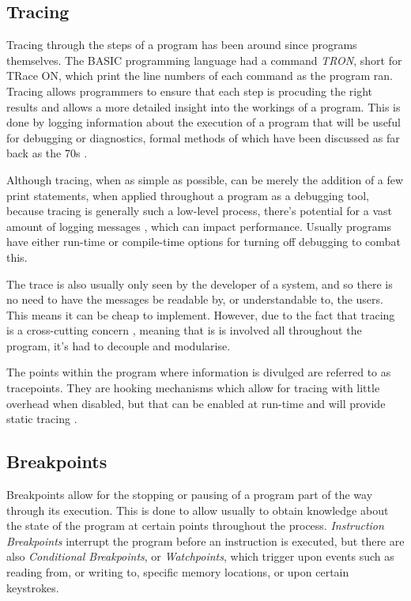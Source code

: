 \documentclass{UoYCSproject}
\begin{document}
\subsection{Tracing}
Tracing through the steps of a program has been around since programs themselves. The BASIC programming language had a command \emph{TRON}, short for TRace ON, which print the line numbers of each command as the program ran. 
Tracing allows programmers to ensure that each step is procuding the right results and allows a more detailed insight into the workings of a program. This is done by logging information about the execution of a program that will be useful for debugging or diagnostics, formal methods of which have been discussed as far back as the 70s \cite{psych_debug, code_walkthroughs}.

Although tracing, when as simple as possible, can be merely the addition of a few print statements, when applied throughout a program as a debugging tool, because tracing is generally such a low-level process, there's potential for a vast amount of logging messages \cite{}, which can impact performance. Usually programs have either run-time or compile-time options for turning off debugging to combat this. %

The trace is also usually only seen by the developer of a system, and so there is no need to have the messages be readable by, or understandable to, the users. This means it can be cheap to implement. However, due to the fact that tracing is a cross-cutting concern \cite{}, meaning that is is involved all throughout the program, it's had to decouple and modularise. %

The points within the program where information is divulged are referred to as tracepoints. They are hooking mechanisms which allow for tracing with little overhead when disabled, but that can be enabled at run-time and will provide static tracing \cite{tracing_book}.

\subsection{Breakpoints}
Breakpoints allow for the stopping or pausing of a program part of the way through its execution. This is done to allow usually to obtain knowledge about the state of the program at certain points throughout the process. \emph{Instruction Breakpoints} interrupt the program before an instruction is executed, but there are also \emph{Conditional Breakpoints}, or \emph{Watchpoints}, which trigger upon events such as reading from, or writing to, specific memory locations, or upon certain keystrokes.
\end{document}

